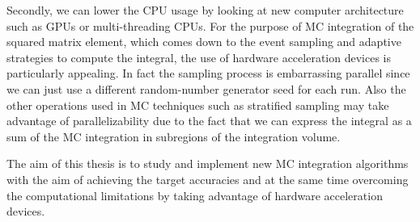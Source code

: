 \documentclass[../main/main.tex]{subfiles}
\begin{document}
Secondly, we can lower the CPU usage by looking at new computer architecture such as GPUs or multi-threading CPUs.
 For the purpose of MC integration of the squared matrix element, which comes down to the event sampling and adaptive strategies to compute
 the integral, the use of hardware acceleration devices is particularly appealing. In fact the sampling process is embarrassing parallel since we can
 just use a different random-number generator seed for each run. Also the other operations used in MC techniques such as stratified sampling may
 take advantage of parallelizability due to the fact that we can express the integral as a sum of the MC integration in subregions of the integration volume.
 
 The aim of this thesis is to study and implement new MC integration algorithms with the aim of achieving the target accuracies and at the same time overcoming the computational limitations by taking advantage of hardware acceleration devices.

























 


 
\end{document}
